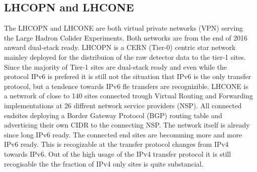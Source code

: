 \subsection{LHCOPN and LHCONE}

The LHCOPN and LHCONE are both virtual private networks (VPN) serving the Large Hadron Colider Experiments. Both networks are from the end of 2016 anward dual-stack ready. LHCOPN is a CERN (Tier-0) centric star network mainley deployed for the distribuion of the raw detector data to the tier-1 sites. Since the majority of Tier-1 sites are dual-stack ready and even while the protocol IPv6 is prefered it is still not the situation that IPv6 is the only transfer protocol, but a tendence towards IPv6 fle transfers are recognizible. LHCONE is a netwrork of close to 140 sites connected trough Virtual Routing and Forwarding implementations at 26 diffrent network service providers (NSP). All connected endsites deploying a Border Gateway Protocol (BGP) routing table and adverticing their own CIDR to the connecting NSP. The network itself is already since long IPv6 ready. The connected end sites are becomming more and more IPv6 ready. This is recogizable at the  transfer protocol changes from IPv4 towards IPv6. Out of the high usage of the IPv4 transfer protocol it is still recogisable the the fraction of IPv4 only sites is quite substancial.
